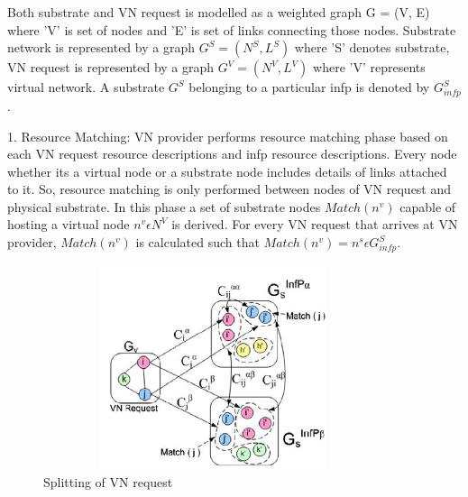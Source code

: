 \documentclass[article,dr=phil,type=msc ,colorback,accentcolor=tud4b]{tudthesis}
\begin{document}
Both substrate and VN request is modelled as a weighted graph G = (V, E) where 'V' is set of nodes and 'E' is set of links connecting those nodes. Substrate network is represented by a graph $G^{S} = (N^{S}, L^{S})$ where 'S' denotes substrate, VN request is represented by a graph $G^{V} = (N^{V}, L^{V})$ where 'V' represents virtual network. A substrate $G^{S}$ belonging to a particular infp is denoted by $G^{S}_{infp}$.\newline

1. Resource Matching: VN provider performs resource matching phase based on each VN request resource descriptions and infp resource descriptions. Every node whether its a virtual node or a substrate node includes details of links attached to it. So, resource matching is only performed between nodes of VN request and physical substrate. 	In this phase a set of substrate nodes $Match(n^{v})$ capable of hosting a virtual node $n^{v} \epsilon N^{V}$ is derived. For every VN request that arrives at VN provider, $Match(n^{v})$ is calculated such that $Match(n^{v}) = {n^{s}} \epsilon G^{S}_{infp}$.\newline

\begin{figure}[h]
	\centering
	\includegraphics[width=10cm, height=6cm]{vn_splitting.jpg}
	\caption{Splitting of VN request}
	\label{fig: VN splitting}
\end{figure}
\end{document}
